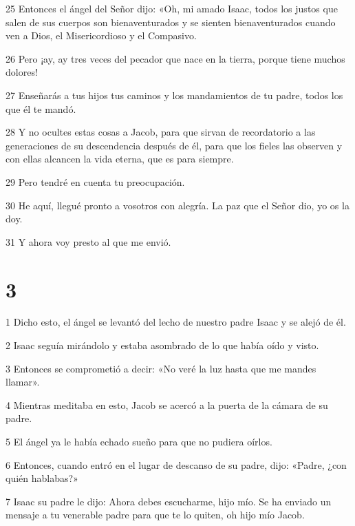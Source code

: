 \par 25 Entonces el ángel del Señor dijo: «Oh, mi amado Isaac, todos los justos que salen de sus cuerpos son bienaventurados y se sienten bienaventurados cuando ven a Dios, el Misericordioso y el Compasivo.

\par 26 Pero ¡ay, ay tres veces del pecador que nace en la tierra, porque tiene muchos dolores!

\par 27 Enseñarás a tus hijos tus caminos y los mandamientos de tu padre, todos los que él te mandó.

\par 28 Y no ocultes estas cosas a Jacob, para que sirvan de recordatorio a las generaciones de su descendencia después de él, para que los fieles las observen y con ellas alcancen la vida eterna, que es para siempre.

\par 29 Pero tendré en cuenta tu preocupación.

\par 30 He aquí, llegué pronto a vosotros con alegría. La paz que el Señor dio, yo os la doy.

\par 31 Y ahora voy presto al que me envió.

\chapter{3}

\par 1 Dicho esto, el ángel se levantó del lecho de nuestro padre Isaac y se alejó de él.

\par 2 Isaac seguía mirándolo y estaba asombrado de lo que había oído y visto.

\par 3 Entonces se comprometió a decir: «No veré la luz hasta que me mandes llamar».

\par 4 Mientras meditaba en esto, Jacob se acercó a la puerta de la cámara de su padre.

\par 5 El ángel ya le había echado sueño para que no pudiera oírlos.

\par 6 Entonces, cuando entró en el lugar de descanso de su padre, dijo: «Padre, ¿con quién hablabas?»

\par 7 Isaac su padre le dijo: Ahora debes escucharme, hijo mío. Se ha enviado un mensaje a tu venerable padre para que te lo quiten, oh hijo mío Jacob.

